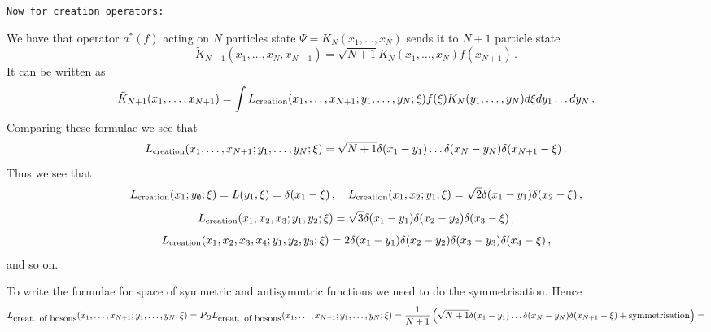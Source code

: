 \bigskip

{\tt Now for creation operators:}



  We have that operator $a^*(f)$ acting on $N$ particles
state $\Psi=K_N(x_1,\dots,x_N)$ sends it to $N+1$
particle state
        $$
\tilde K_{N+1}(x_1,\dots,x_{N},x_{N+1})=\sqrt {N+1}
K_N(x_1,\dots,x_{N})f(x_{N+1})\,.
       $$
It can be written as
           $$
\tilde K_{N+1}(x_1,\dots,x_{N+1})=
      \int
L_{\rm creation}(x_1,\dots,x_{N+1};
y_1,\dots,y_N;\xi)
f(\xi)K_N(y_1,\dots,y_N)d\xi dy_1\dots dy_N\,.
           $$
     Comparing these formulae we see that
           $$
L_{\rm creation}(x_1,\dots,x_{N+1};
y_1,\dots,y_N;\xi)=
\sqrt {N+1}
  \delta(x_1-y_1)
   \dots
  \delta (x_{N}-y_{N})
   \delta (x_{N+1}-\xi)\,.
           $$
Thus we see that
        $$
L_{\rm creation}(x_1; y_{\emptyset};\xi)=L(y_1,\xi)=
   \delta (x_1-\xi)\,,\quad
L_{\rm creation}(x_1,x_2;
y_1;\xi)=
\sqrt {2}
  \delta (x_1-y_1)
   \delta (x_2-\xi)\,,
       $$
  $$
L_{\rm creation}(x_1,x_2,x_3;
y_1,y_2;\xi)=
\sqrt {3}
  \delta (x_1-y_1)
  \delta (x_2-y_2)
   \delta (x_3-\xi)\,,
      $$
      $$
 L_{\rm creation}(x_1,x_2,x_3,x_4;
y_1,y_2,y_3;\xi)=
2
  \delta (x_1-y_1)
  \delta (x_2-y_2)
  \delta (x_3-y_3)
   \delta (x_4-\xi)\,,
  $$
and so on.

To write the formulae for space of symmetric and
antisymmtric
functions we need to do the symmetrisation. Hence
                     $$
L_{\hbox {creat. of bosons}}(x_1,\dots,x_{N+1};
y_1,\dots,y_N;\xi)=
P_B
L_{\hbox {creat. of bosons}}(x_1,\dots,x_{N+1};
y_1,\dots,y_N;\xi)=
    {1\over N+1}
  \left(
\sqrt {N+1}
  \delta(x_1-y_1)
   \dots
  \delta (x_{N}-y_{N})
   \delta (x_{N+1}-\xi)
 +\hbox {symmetrisation}
     \right)=
          $$


\bye

